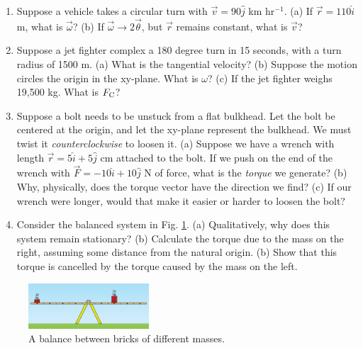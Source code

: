 \documentclass{article}
\begin{document}
\begin{enumerate}
\item Suppose a vehicle takes a circular turn with $\vec{v} = 90\hat{j}$ km hr$^{-1}$.  (a) If $\vec{r} = 110\hat{i}$ m, what is $\vec{\omega}$? (b) If $\vec{\omega} \rightarrow 2\vec{\theta}$, but $\vec{r}$ remains constant, what is $\vec{v}$? \\ \vspace{2cm}
\item Suppose a jet fighter complex a 180 degree turn in 15 seconds, with a turn radius of 1500 m. (a) What is the tangential velocity? (b) Suppose the motion circles the origin in the xy-plane.  What is $\omega$? (c) If the jet fighter weighs 19,500 kg.  What is $F_{\rm C}$?  \\ \vspace{2cm}
\item Suppose a bolt needs to be unstuck from a flat bulkhead.  Let the bolt be centered at the origin, and let the xy-plane represent the bulkhead.  We must twist it \textit{counterclockwise} to loosen it.  (a) Suppose we have a wrench with length $\vec{r} = 5\hat{i} + 5\hat{j}$ cm attached to the bolt.  If we push on the end of the wrench with $\vec{F} = -10\hat{i}+10\hat{j}$ N of force, what is the \textit{torque} we generate? (b) Why, physically, does the torque vector have the direction we find? (c) If our wrench were longer, would that make it easier or harder to loosen the bolt? \\ \vspace{2cm}
\item Consider the balanced system in Fig. \ref{fig:1}.  (a) Qualitatively, why does this system remain stationary? (b) Calculate the torque due to the mass on the right, assuming some distance from the natural origin.  (b) Show that this torque is cancelled by the torque caused by the mass on the left.
\end{enumerate}

\begin{figure}
\centering
\includegraphics[width=0.4\textwidth]{figures/brick.png}
\caption{\label{fig:1} A balance between bricks of different masses.}
\end{figure}
\end{document}
